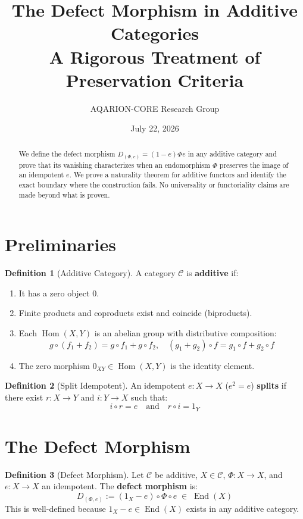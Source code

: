 \documentclass[11pt,a4paper]{article}
\title{\textbf{The Defect Morphism in Additive Categories}\\[0.3em]
\large A Rigorous Treatment of Preservation Criteria}
\author{AQARION-CORE Research Group}
\date{July 22, 2026}
\theoremstyle{definition}
\newtheorem{definition}{Definition}[section]
\begin{document}
\maketitle

\begin{abstract}
We define the defect morphism $D_{(\Phi,e)} = (1-e)\Phi e$ in any additive category and prove that its vanishing characterizes when an endomorphism $\Phi$ preserves the image of an idempotent $e$. We prove a naturality theorem for additive functors and identify the exact boundary where the construction fails. No universality or functoriality claims are made beyond what is proven.
\end{abstract}

\section{Preliminaries}

\begin{definition}[Additive Category]
A category $\mathcal{C}$ is \textbf{additive} if:
\begin{enumerate}
\item It has a zero object $0$.
\item Finite products and coproducts exist and coincide (biproducts).
\item Each $\operatorname{Hom}(X,Y)$ is an abelian group with distributive composition:
\[
g \circ (f_1 + f_2) = g \circ f_1 + g \circ f_2, \quad (g_1 + g_2) \circ f = g_1 \circ f + g_2 \circ f
\]
\item The zero morphism $0_{XY} \in \operatorname{Hom}(X,Y)$ is the identity element.
\end{enumerate}
\end{definition}

\begin{definition}[Split Idempotent]
An idempotent $e: X \to X$ ($e^2 = e$) \textbf{splits} if there exist $r: X \to Y$ and $i: Y \to X$ such that:
\[
i \circ r = e \quad \text{and} \quad r \circ i = 1_Y
\]
\end{definition}

\section{The Defect Morphism}

\begin{definition}[Defect Morphism]
Let $\mathcal{C}$ be additive, $X \in \mathcal{C}$, $\Phi: X \to X$, and $e: X \to X$ an idempotent. The \textbf{defect morphism} is:
\[
\boxed{D_{(\Phi,e)} := (1_X - e) \circ \Phi \circ e \; \in \; \operatorname{End}(X)}
\]
This is well-defined because $1_X - e \in \operatorname{End}(X)$ exists in any additive category.
\end{definition}
\end{document}
